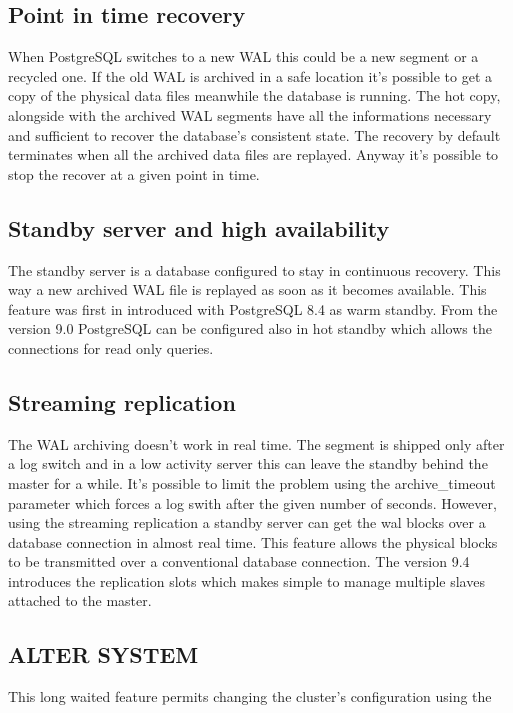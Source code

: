 \subsection{Point in time recovery}
When PostgreSQL switches to a new 
WAL this could be a new segment or a recycled one. If the old WAL is archived in a safe
location it's possible to get a copy of the physical data files meanwhile the database is running. 
The hot copy, alongside with the archived WAL segments have all the informations necessary and 
sufficient to recover the database's consistent state. The recovery by default terminates when all 
the archived data files are replayed. Anyway it's possible to stop the recover at a given point in 
time. 

\subsection{Standby server and high availability}
The standby server is a database configured to 
stay in continuous recovery. This way a new archived WAL file is replayed as soon as it becomes 
available. This feature was first in introduced with  PostgreSQL 8.4 as warm standby. From the version 9.0 PostgreSQL can be configured also in hot standby  
which allows the connections for read only queries.

\subsection{Streaming replication}
The WAL archiving doesn't work in real time. The segment is shipped only after a log switch and 
in a low activity server this can leave the standby behind the master for a while. It's  possible 
to limit the problem using the archive\_timeout parameter which forces a log swith after the given 
number of seconds. However, using the streaming replication a standby 
server can get the wal blocks over a database connection in almost real time. This feature allows 
the physical blocks to be transmitted over a conventional database connection. The version 9.4 introduces 
the replication slots which makes simple to manage multiple slaves attached to the master.

\subsection{ALTER SYSTEM}
This long waited feature permits changing the cluster's configuration using the 


